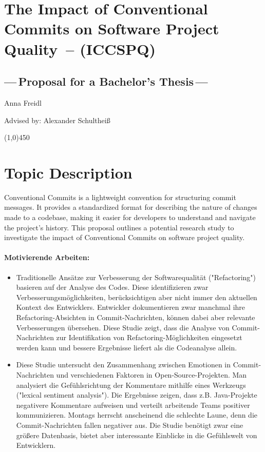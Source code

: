\documentclass[11pt]{article}
\newcommand{\ThesisTitle}{The Impact of Conventional Commits on Software Project Quality\xspace}
\newcommand{\ProjectAcronym}{\textsc{ICCSPQ}\xspace}
\begin{document}
\section*{\ThesisTitle\ -- (\ProjectAcronym)}
\subsection*{---\,Proposal for a Bachelor's Thesis\,---}

\sloppy

\noindent Anna Freidl

\noindent Advised by: Alexander Schultheiß

\begin{center}
\line(1,0){450}
\end{center}

\section*{Topic Description}
Conventional Commits is a lightweight convention for structuring commit messages. \cite{conventionalcommits} It provides a standardized format for describing the nature of changes made to a codebase, making it easier for developers to understand and navigate the project's history. This proposal outlines a potential research study to investigate the impact of Conventional Commits on software project quality.

\paragraph{Motivierende Arbeiten:} 
\begin{itemize}
\item \cite{refrecommendation} Traditionelle Ansätze zur Verbesserung der Softwarequalität ("Refactoring") basieren auf der Analyse des Codes. Diese identifizieren zwar Verbesserungsmöglichkeiten, berücksichtigen aber nicht immer den aktuellen Kontext des Entwicklers. Entwickler dokumentieren zwar manchmal ihre Refactoring-Absichten in Commit-Nachrichten, können dabei aber relevante Verbesserungen übersehen. Diese Studie zeigt, dass die Analyse von Commit-Nachrichten zur Identifikation von Refactoring-Möglichkeiten eingesetzt werden kann und bessere Ergebnisse liefert als die Codeanalyse allein.

\item \cite{commitanalysis} Diese Studie untersucht den Zusammenhang zwischen Emotionen in Commit-Nachrichten und verschiedenen Faktoren in Open-Source-Projekten. Man analysiert die Gefühlsrichtung der Kommentare mithilfe eines Werkzeugs ("lexical sentiment analysis"). Die Ergebnisse zeigen, dass z.B. Java-Projekte negativere Kommentare aufweisen und verteilt arbeitende Teams positiver kommunizieren. Montags herrscht anscheinend die schlechte Laune, denn die Commit-Nachrichten fallen negativer aus. Die Studie benötigt zwar eine größere Datenbasis, bietet aber interessante Einblicke in die Gefühlswelt von Entwicklern.
\end{itemize}
\end{document}
